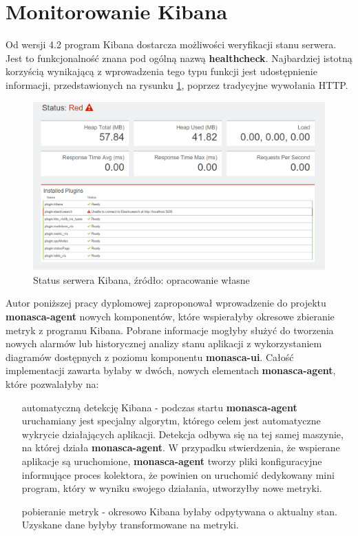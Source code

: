 \section{Monitorowanie Kibana}
\label{chapter:application_own:plans:monitoring_kibana}

Od wersji 4.2 program Kibana dostarcza możliwości weryfikacji stanu serwera. Jest to funkcjonalność znana pod ogólną nazwą
\textbf{healthcheck}. Najbardziej istotną korzyścią wynikającą z wprowadzenia tego typu funkcji jest 
udostępnienie informacji, przedstawionych na rysunku \ref{chapter:application_own:plans:monitoring_kibana:picture},
poprzez tradycyjne wywołania HTTP. 

\begin{figure}[H]
    \centering
    \includegraphics[width=1.0\textwidth]{images/kibana_status}
    \caption[Status serwera Kibana]{
        Status serwera Kibana, źródło: opracowanie własne
    }
    \label{chapter:application_own:plans:monitoring_kibana:picture}
\end{figure}

Autor poniższej pracy dyplomowej zaproponował wprowadzenie do projektu \textbf{monasca-agent} nowych komponentów, które
wspierałyby okresowe zbieranie metryk z programu Kibana. Pobrane informacje mogłyby służyć do tworzenia
nowych alarmów lub historycznej analizy stanu aplikacji z wykorzystaniem diagramów dostępnych z poziomu komponentu 
\textbf{monasca-ui}. Całość implementacji zawarta byłaby w dwóch, nowych elementach \textbf{monasca-agent}, które
pozwalałyby na:
\begin{itemize}
    \item[automatyczną detekcję Kibana] - podczas startu \textbf{monasca-agent} uruchamiany jest specjalny algorytm, którego
    celem jest automatyczne wykrycie działających aplikacji. Detekcja odbywa się na tej samej maszynie, na której działa 
    \textbf{monasca-agent}. W przypadku stwierdzenia, że wspierane aplikacje są uruchomione, \textbf{monasca-agent} tworzy 
    pliki konfiguracyjne informujące proces kolektora, że powinien on uruchomić dedykowany mini program, który w wyniku
    swojego działania, utworzyłby nowe metryki.
    \item[pobieranie metryk] - okresowo Kibana byłaby odpytywana o aktualny stan. Uzyskane dane byłyby transformowane
    na metryki.
\end{itemize}